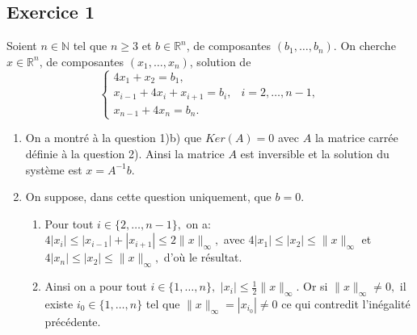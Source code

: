 \documentclass{article}
\date{}%
\renewcommand{\geq}{\geqslant}
\renewcommand{\leq}{\leqslant}
\newcommand{\1}{\ensuremath{\mathbbm{1}}}
\begin{document}
\subsection*{Exercice 1}

Soient $n \in \mathbb{N}$ tel que $n \geq 3$ et $b \in \mathbb{R}^n$, de composantes $(b_1, \ldots, b_n)$. On cherche $x \in \mathbb{R}^n$, de composantes $(x_1, \ldots, x_n)$, solution de
\[
\begin{cases}
4x_1 + x_2 = b_1, \\
x_{i-1} + 4x_i + x_{i+1} = b_i, & i = 2, \ldots, n - 1, \\
x_{n-1} + 4x_n = b_n.
\end{cases}
\]


\begin{enumerate}

    \item On a montr\'e \`a la question 1)b) que $Ker(A)=0$ avec $A$ la matrice carr\'ee d\'efinie \`a la question 2). Ainsi la matrice $A$ est inversible et la solution du syst\`eme est $x=A^{-1}b$.
    \item On suppose, dans cette question uniquement, que $b = 0$.
    \begin{enumerate}
        \item Pour tout $i \in \{2, \ldots, n-1\},$ on a:\\
$4 |x_i|\leq |x_{i-1}|+|x_{i+1}|\leq 2 \|x\|_\infty,$
avec $4 |x_1|\leq |x_2|\leq \|x\|_\infty$ et $4 |x_{n}|\leq |x_2|\leq \|x\|_\infty,$
d'o\`u le r\'esultat. 



        \item Ainsi on a pour tout $i \in \{1, \ldots, n\},$ $|x_i|\leq \frac{1}{2}\|x\|_{\infty}$. Or si $\|x\|_{\infty}\neq 0,$ il existe $i_0  \in \{1, \ldots, n\}$ tel que $\|x\|_{\infty}=|x_{i_{0}}|\neq 0$ ce qui contredit l'in\'egalit\'e pr\'ec\'edente.
    \end{enumerate}


\end{enumerate}
\end{document}
